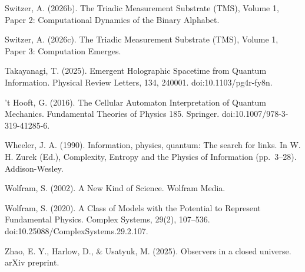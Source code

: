 \documentclass[11pt,oneside]{report}
\theoremstyle{definition}
\theoremstyle{remark}
\newenvironment{reflist}
  {\par\small\setlength{\parindent}{0pt}%
   \setlength{\leftskip}{1.6em}\setlength{\parindent}{-1.6em}%
   \setlength{\parskip}{0.4em}%
   \raggedright\hyphenpenalty=50\exhyphenpenalty=50\relax
   \sloppy}
  {\par}
\begin{document}
\begin{reflist}
Switzer, A. (2026b). The Triadic Measurement Substrate (TMS), Volume 1,
Paper 2: Computational Dynamics of the Binary Alphabet.

Switzer, A. (2026c). The Triadic Measurement Substrate (TMS), Volume 1,
Paper 3: Computation Emerges.

Takayanagi, T. (2025). Emergent Holographic Spacetime from Quantum
Information. Physical Review Letters, 134, 240001.
doi:10.1103/pg4r-fy8n.

't Hooft, G. (2016). The Cellular Automaton Interpretation of Quantum
Mechanics. Fundamental Theories of Physics 185. Springer.
doi:10.1007/978-3-319-41285-6.

Wheeler, J. A. (1990). Information, physics, quantum: The search for
links. In W. H. Zurek (Ed.), Complexity, Entropy and the Physics of
Information (pp.~3--28). Addison-Wesley.

Wolfram, S. (2002). A New Kind of Science. Wolfram Media.

Wolfram, S. (2020). A Class of Models with the Potential to Represent
Fundamental Physics. Complex Systems, 29(2), 107--536.
doi:10.25088/ComplexSystems.29.2.107.

Zhao, E. Y., Harlow, D., \& Usatyuk, M. (2025). Observers in a closed
universe. arXiv preprint.
\end{reflist}

\clearpage
\end{document}
